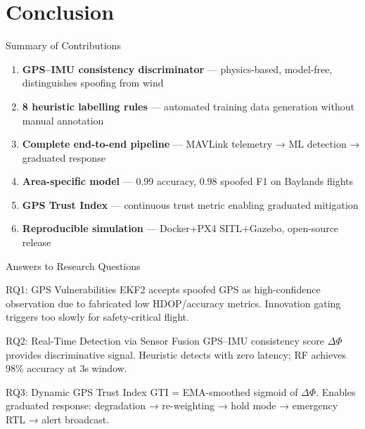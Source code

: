 \documentclass[11pt]{beamer}
\begin{document}
\section{Conclusion}
\begin{frame}{Summary of Contributions}
\begin{enumerate}
    \item \textbf{GPS--IMU consistency discriminator} — physics-based, model-free, distinguishes spoofing from wind
    \item \textbf{8 heuristic labelling rules} — automated training data generation without manual annotation
    \item \textbf{Complete end-to-end pipeline} — MAVLink telemetry → ML detection → graduated response
    \item \textbf{Area-specific model} — 0.99 accuracy, 0.98 spoofed F1 on Baylands flights
    \item \textbf{GPS Trust Index} — continuous trust metric enabling graduated mitigation
    \item \textbf{Reproducible simulation} — Docker+PX4 SITL+Gazebo, open-source release
\end{enumerate}
\end{frame}

\begin{frame}{Answers to Research Questions}
\begin{block}{RQ1: GPS Vulnerabilities}
    EKF2 accepts spoofed GPS as high-confidence observation due to fabricated low HDOP/accuracy metrics. Innovation gating triggers too slowly for safety-critical flight.
\end{block}
\begin{block}{RQ2: Real-Time Detection via Sensor Fusion}
    GPS--IMU consistency score $\Delta\Phi$ provides discriminative signal. Heuristic detects with zero latency; RF achieves 98\% accuracy at 3s window.
\end{block}
\begin{block}{RQ3: Dynamic GPS Trust Index}
    GTI = EMA-smoothed sigmoid of $\Delta\Phi$. Enables graduated response: degradation → re-weighting → hold mode → emergency RTL → alert broadcast.
\end{block}
\end{frame}
\end{document}

